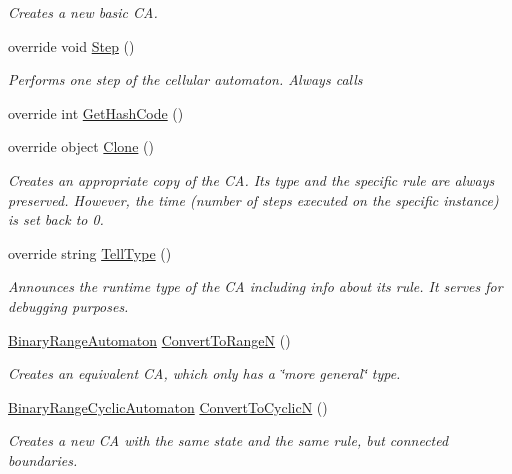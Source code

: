 \begin{DoxyCompactItemize}
\begin{DoxyCompactList}\small\item\em Creates a new basic C\+A. \end{DoxyCompactList}\item 
override void \hyperlink{class_cellular_1_1_elementary_automaton_adae7c322e4c7cd00cd0534a23d1abfa4}{Step} ()
\begin{DoxyCompactList}\small\item\em Performs one step of the cellular automaton. Always calls \end{DoxyCompactList}\item 
override int \hyperlink{class_cellular_1_1_elementary_automaton_abaa1bb77264571ec245155f079fe1ff0}{Get\+Hash\+Code} ()
\item 
override object \hyperlink{class_cellular_1_1_elementary_automaton_ada4ddee98167e8f4f4b6dea1f7563b47}{Clone} ()
\begin{DoxyCompactList}\small\item\em Creates an appropriate copy of the C\+A. Its type and the specific rule are always preserved. However, the time (number of steps executed on the specific instance) is set back to 0. \end{DoxyCompactList}\item 
override string \hyperlink{class_cellular_1_1_elementary_automaton_a812677139d560e2c600226361b785995}{Tell\+Type} ()
\begin{DoxyCompactList}\small\item\em Announces the runtime type of the C\+A including info about its rule. It serves for debugging purposes. \end{DoxyCompactList}\item 
\hyperlink{class_cellular_1_1_binary_range_automaton}{Binary\+Range\+Automaton} \hyperlink{class_cellular_1_1_elementary_automaton_aef244148e0234495c1f0afaef7f22e28}{Convert\+To\+Range\+N} ()
\begin{DoxyCompactList}\small\item\em Creates an equivalent C\+A, which only has a \char`\"{}more general\char`\"{} type. \end{DoxyCompactList}\item 
\hyperlink{class_cellular_1_1_binary_range_cyclic_automaton}{Binary\+Range\+Cyclic\+Automaton} \hyperlink{class_cellular_1_1_elementary_automaton_a8876a09ba28af93b0e5163eef3cbe79e}{Convert\+To\+Cyclic\+N} ()
\begin{DoxyCompactList}\small\item\em Creates a new C\+A with the same state and the same rule, but connected boundaries. \end{DoxyCompactList}\end{DoxyCompactItemize}
